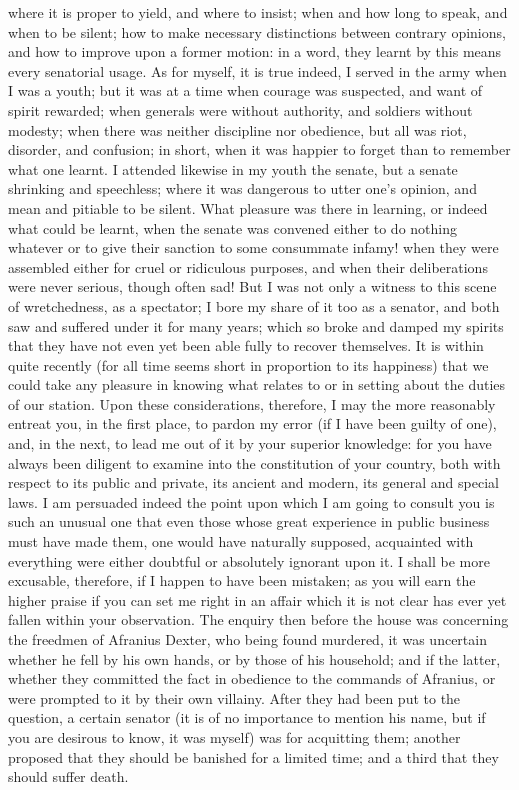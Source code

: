 where it is proper to yield, and where to insist; when and how long to
speak, and when to be silent; how to make necessary distinctions between
contrary opinions, and how to improve upon a former motion: in a word,
they learnt by this means every senatorial usage. As for myself, it is
true indeed, I served in the army when I was a youth; but it was at a time
when courage was suspected, and want of spirit rewarded; when generals
were without authority, and soldiers without modesty; when there was
neither discipline nor obedience, but all was riot, disorder, and
confusion; in short, when it was happier to forget than to remember what
one learnt. I attended likewise in my youth the senate, but a senate
shrinking and speechless; where it was dangerous to utter one's opinion,
and mean and pitiable to be silent. What pleasure was there in learning,
or indeed what could be learnt, when the senate was convened either to do
nothing whatever or to give their sanction to some consummate infamy! when
they were assembled either for cruel or ridiculous purposes, and when
their deliberations were never serious, though often sad! But I was not
only a witness to this scene of wretchedness, as a spectator; I bore my
share of it too as a senator, and both saw and suffered under it for many
years; which so broke and damped my spirits that they have not even yet
been able fully to recover themselves. It is within quite recently (for
all time seems short in proportion to its happiness) that we could take
any pleasure in knowing what relates to or in setting about the duties of
our station. Upon these considerations, therefore, I may the more
reasonably entreat you, in the first place, to pardon my error (if I have
been guilty of one), and, in the next, to lead me out of it by your
superior knowledge: for you have always been diligent to examine into the
constitution of your country, both with respect to its public and private,
its ancient and modern, its general and special laws. I am persuaded
indeed the point upon which I am going to consult you is such an unusual
one that even those whose great experience in public business must have
made them, one would have naturally supposed, acquainted with everything
were either doubtful or absolutely ignorant upon it. I shall be more
excusable, therefore, if I happen to have been mistaken; as you will earn
the higher praise if you can set me right in an affair which it is not
clear has ever yet fallen within your observation. The enquiry then before
the house was concerning the freedmen of Afranius Dexter, who being found
murdered, it was uncertain whether he fell by his own hands, or by those
of his household; and if the latter, whether they committed the fact in
obedience to the commands of Afranius, or were prompted to it by their own
villainy. After they had been put to the question, a certain senator (it
is of no importance to mention his name, but if you are desirous to know,
it was myself) was for acquitting them; another proposed that they should
be banished for a limited time; and a third that they should suffer death.

